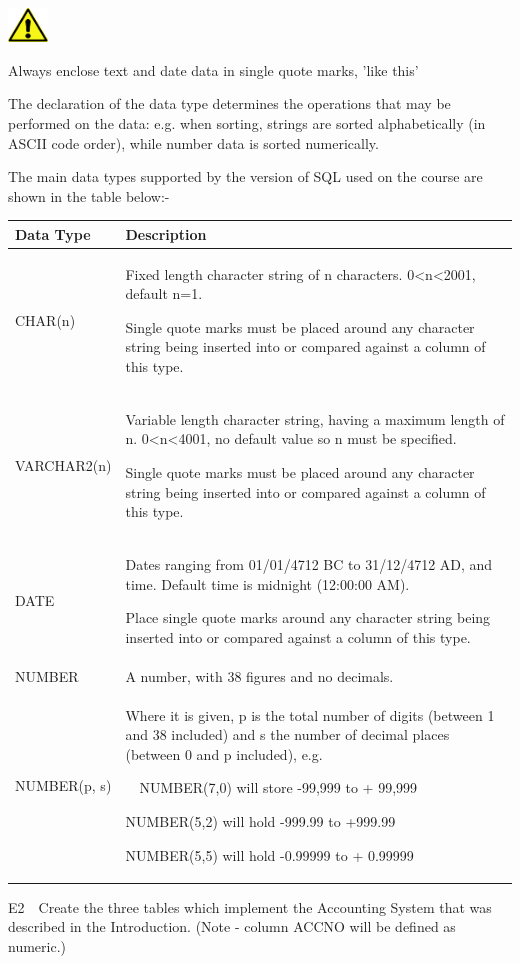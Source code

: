 \begin{center}
  
\includegraphics[width=1.06cm,height=0.903cm]{images/img (2).png}

\end{center}
Always enclose text and date data in single quote marks, 'like this'

The declaration of the data type determines the operations that may be performed on the data: e.g. when sorting, strings are sorted alphabetically (in ASCII code order), while number data is sorted numerically.

The main data types supported by the version of SQL used on the course are shown in the table below:-

\begin{flushleft}
\tablefirsthead{}
\tablehead{}
\tabletail{}
\tablelasttail{}
\begin{supertabular}{|m{3.552cm}|m{12.048cm}|}
\hline
Data Type &
Description\\\hline
CHAR(n) &
Fixed length character string of n characters. 0{\textless}n{\textless}2001, default n=1.

Single quote marks must be placed around any character string being inserted into or compared against a column of this type.\\\hline
VARCHAR2(n)

 &
Variable length character string, having a maximum length of n. 0{\textless}n{\textless}4001, no default value so n must be specified.

Single quote marks must be placed around any character string being inserted into or compared against a column of this type.\\\hline
DATE &
Dates ranging from 01/01/4712 BC to 31/12/4712 AD, and time.  Default time is midnight (12:00:00 AM).

Place single quote marks around any character string being inserted into or compared against a column of this type.\\\hline
NUMBER  &
A number, with 38 figures and no decimals.\ \ \\\hline
NUMBER(p, s) &
Where it is given, p is the total number of digits (between 1 and 38 included) and s the number of decimal places (between 0 and p included), e.g.

\ \ NUMBER(7,0) will store -99,999 to + 99,999

 NUMBER(5,2) will hold -999.99 to +999.99

 NUMBER(5,5) will hold -0.99999 to + 0.99999\\\hline
\end{supertabular}
\end{flushleft}
E2\ \ Create the three tables which implement the Accounting System that was described in the Introduction. (Note - column ACCNO will be defined as numeric.) 

